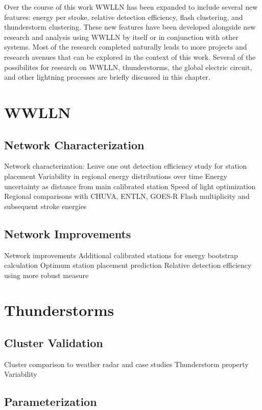 Over the course of this work WWLLN has been expanded to include several new features: energy per stroke, relative detection efficiency, flash clustering, and thunderstorm clustering.
These new features have been developed alongside new research and analysis using WWLLN by itself or in conjunction with other systems.
Most of the research completed naturally leads to more projects and research avenues that can be explored in the context of this work.
Several of the possibilites for research on WWLLN, thunderstorms, the global electric circuit, and other lightning processes are briefly discussed in this chapter.

\section{WWLLN}

\subsection{Network Characterization}

Network characterization:
  Leave one out detection efficiency study for station placement
  Variability in regional energy distributions over time
  Energy uncertainty as distance from main calibrated station
  Speed of light optimization
  Regional comparisons with CHUVA, ENTLN, GOES-R
  Flash multiplicity and subsequent stroke energies
\subsection{Network Improvements}

Network improvements
  Additional calibrated stations for energy bootstrap calculation
  Optimum station placement prediction
  Relative detection efficiency using more robust measure

\section{Thunderstorms}

\subsection{Cluster Validation}

Cluster comparison to weather radar and case studies
  Thunderstorm property Variability

\subsection{Parameterization}

